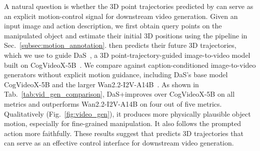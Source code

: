 A natural question is whether the 3D point trajectories predicted by \modelname can serve as an explicit motion-control signal for downstream video generation. Given an input image and action description, we first obtain query points on the manipulated object and estimate their initial 3D positions using the pipeline in Sec.~\ref{subsec:motion_annotation}. \modelname then predicts their future 3D trajectories, which we use to guide DaS~\cite{gu2025diffusionasshader}, a 3D point-trajectory-guided image-to-video model built on CogVideoX-5B~\cite{yang2025cogvideoxtexttovideodiffusionmodels}. We compare against caption-conditioned image-to-video generators without explicit motion guidance, including DaS's base model CogVideoX-5B and the larger Wan2.2-I2V-A14B~\cite{wan22}. As shown in Tab.~\ref{tab:vid_gen_comparison}, DaS+\modelname improves over CogVideoX-5B on all metrics and outperforms Wan2.2-I2V-A14B on four out of five metrics. Qualitatively (Fig.~\ref{fig:video_gen}), it produces more physically plausible object motion, especially for fine-grained manipulation. It also follows the prompted action more faithfully. These results suggest that \modelname predicts 3D trajectories that can serve as an effective control interface for downstream video generation.


